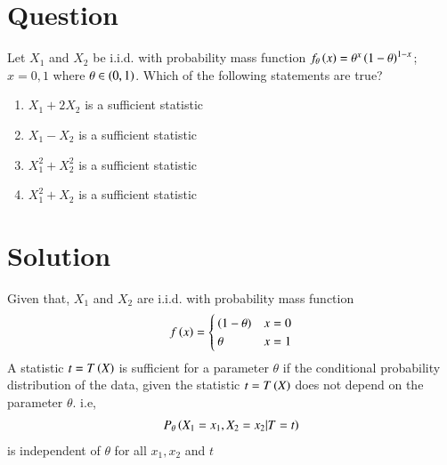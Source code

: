 \documentclass[journal,12pt,twocolumn]{IEEEtran}
\begin{document}
\section*{Question}
Let $X_1$ and $X_2$ be i.i.d. with probability mass function $f_{\theta}\left(x\right) = \theta^x \left(1-\theta\right)^{1-x}$; $x=0,1$ where $\theta \in \left(0,1\right)$. Which of the following statements are true?
\begin{enumerate}
    \item $X_1 + 2X_2 $ is a sufficient statistic
    \item $X_1 - X_2 $ is a sufficient statistic
    \item $X_1^2 + X_2^2 $ is a sufficient statistic
    \item $X_1^2 + X_2 $ is a sufficient statistic
\end{enumerate}
\section*{Solution}
Given that, $X_1$ and $X_2$ are i.i.d. with probability mass function
\begin{align}
    f\left(x\right) = 
    \begin{cases}
    \left(1-\theta\right) & x=0\\
    \theta & x=1
    \end{cases}
\end{align}
A statistic $t=T\left(X\right)$ is sufficient for a parameter $\theta$ if the conditional probability distribution of the data, given the statistic $t=T\left(X\right)$ does not depend on the parameter $\theta$. i.e,
\begin{align}
    P_\theta\left(X_1=x_1,X_2=x_2|T=t\right)
\end{align}
is independent of $\theta$ for all $x_1,x_2$ and $t$
\end{document}
